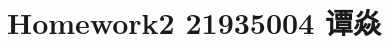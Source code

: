 \documentclass[a4paper]{book}
\makeatletter
\newcommand{\voidenvironment}[1]{%
  \expandafter\providecommand\csname env@#1@save@env\endcsname{}%
  \expandafter\providecommand\csname env@#1@process\endcsname{}%
  \@ifundefined{#1}{}{\RenewEnviron{#1}{}}%
}
\numberwithin{equation}{chapter}
\theoremstyle{definition}
\makeatother
\begin{document}
\pagestyle{empty}

\clearpage



\setcounter{chapter}{0}




\chapter{Homework2 21935004 谭焱}
\end{document}
